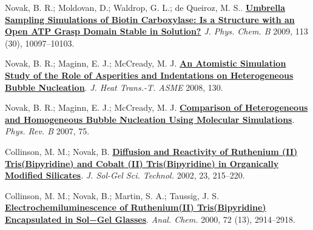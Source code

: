 \begin{cventries}
{\begin{cvitems}
        \item{Novak, B. R.; Moldovan, D.; Waldrop, G. L.; de Queiroz, M. S.. \href{https://doi.org/10.1021/jp810650q}{\textbf{Umbrella Sampling Simulations of Biotin Carboxylase: Is a Structure with an Open ATP Grasp Domain Stable in Solution?}} \textit{J. Phys. Chem. B} 2009, 113 (30), 10097–10103.}
        \item{Novak, B. R.; Maginn, E. J.; McCready, M. J. \href{https://doi.org/10.1115/1.2818771}{\textbf{An Atomistic Simulation Study of the Role of Asperities and Indentations on Heterogeneous Bubble Nucleation}}. \textit{J. Heat Trans.-T. ASME} 2008, 130.}
        \item{Novak, B. R.; Maginn, E. J.; McCready, M. J. \href{https://doi.org/10.1103/PhysRevB.75.085413}{\textbf{Comparison of Heterogeneous and Homogeneous Bubble Nucleation Using Molecular Simulations}}. \textit{Phys. Rev. B} 2007, 75. }
        \item{Collinson, M. M.; Novak, B. \href{https://doi.org/10.1023/A:1013966629311}{\textbf{Diffusion and Reactivity of Ruthenium (II) Tris(Bipyridine) and Cobalt (II) Tris(Bipyridine) in Organically Modified Silicates}}. \textit{J. Sol-Gel Sci. Technol.} 2002, 23, 215–220.}
        \item{Collinson, M. M.; Novak, B.; Martin, S. A.; Taussig, J. S. \href{https://doi.org/10.1021/ac9913208}{\textbf{Electrochemiluminescence of Ruthenium(II) Tris(Bipyridine) Encapsulated in Sol−Gel Glasses}}. \textit{Anal. Chem.} 2000, 72 (13), 2914–2918.}        
      \end{cvitems}
    }
    

\end{cventries}
